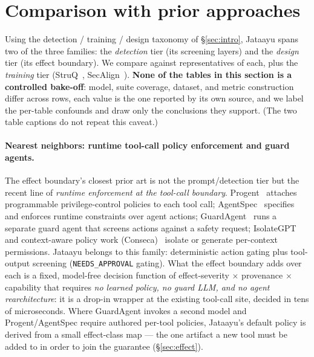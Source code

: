 \documentclass[11pt]{article}
\newcommand{\code}[1]{\texttt{\small #1}}
\begin{document}
\section{Comparison with prior approaches}\label{sec:cmp}
Using the detection / training / design taxonomy of \S\ref{sec:intro}, Jataayu spans two of the
three families: the \emph{detection} tier (its screening layers) and the \emph{design} tier (its
effect boundary). We compare against representatives of each, plus the \emph{training} tier
(StruQ~\cite{struq}, SecAlign~\cite{secalign}). \textbf{None of the tables in this section is a
controlled bake-off}: model, suite coverage, dataset, and metric construction differ across rows,
each value is the one reported by its own source, and we label the per-table confounds and draw
only the conclusions they support. (The two table captions do not repeat this caveat.)

\paragraph{Nearest neighbors: runtime tool-call policy enforcement and guard agents.} The effect
boundary's closest prior art is not the prompt/detection tier but the recent line of
\emph{runtime enforcement at the tool-call boundary}. Progent~\cite{progent} attaches programmable
privilege-control policies to each tool call; AgentSpec~\cite{agentspec} specifies and enforces
runtime constraints over agent actions; GuardAgent~\cite{guardagent} runs a separate guard agent
that screens actions against a safety request; IsolateGPT and context-aware policy work
(Conseca)~\cite{isolategpt} isolate or generate per-context permissions. Jataayu belongs to this
family: deterministic action gating plus tool-output screening (\code{NEEDS\_APPROVAL} gating).
What the effect boundary adds over each is a fixed, model-free decision function of
effect-severity $\times$ provenance $\times$ capability that requires \emph{no learned policy, no
guard LLM, and no agent rearchitecture}: it is a drop-in wrapper at the existing tool-call site,
decided in tens of microseconds. Where GuardAgent invokes a second model and Progent/AgentSpec
require authored per-tool policies, Jataayu's default policy is derived from a small effect-class
map --- the one artifact a new tool must be added to in order to join the guarantee (\S\ref{sec:effect}).
\end{document}

